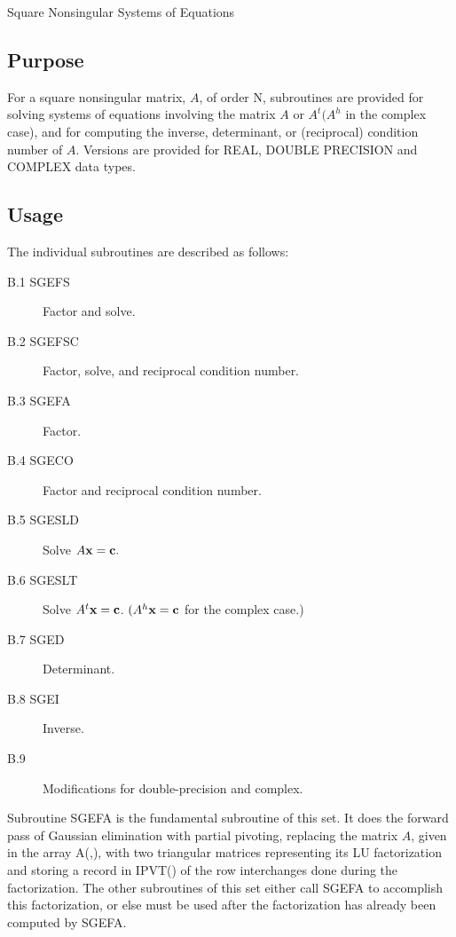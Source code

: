 \documentclass[twoside]{MATH77}
\begin{document}
  Square Nonsingular Systems of Equations


\subsection{Purpose}

For a square nonsingular matrix, $A$, of order N, subroutines are provided
for solving systems of equations involving the matrix $A$ or $A^t (A^h$ in the
complex case), and for computing the inverse, determinant, or (reciprocal)
condition number of $A$. Versions are provided for REAL, DOUBLE PRECISION and
COMPLEX data types.

\subsection{Usage}

The individual subroutines are described as follows:
\begin{description}
\item[B.1 SGEFS] Factor and solve.

\item[B.2 SGEFSC] Factor, solve, and reciprocal condition number.

\item[B.3 SGEFA] Factor.

\item[B.4 SGECO] Factor and reciprocal condition number.

\item[B.5 SGESLD] Solve $A{\bf x} = {\bf c}.$

\item[B.6 SGESLT] Solve $A^t{\bf x} = {\bf c}$. $(A^h{\bf x} = {\bf c}$ for the complex case.)

\item[B.7 SGED] Determinant.

\item[B.8 SGEI] Inverse.

\item[B.9] Modifications for double-precision and complex.
\end{description}

Subroutine SGEFA is the fundamental subroutine of this set. It does the
forward pass of Gaussian elimination with partial pivoting, replacing the
matrix $A$, given in the array A(,), with two triangular matrices representing
its LU factorization and storing a record in IPVT() of the row interchanges
done during the factorization. The other subroutines of this set either call
SGEFA to accomplish this factorization, or else must be used after the
factorization has already been computed by SGEFA.
\end{document}
